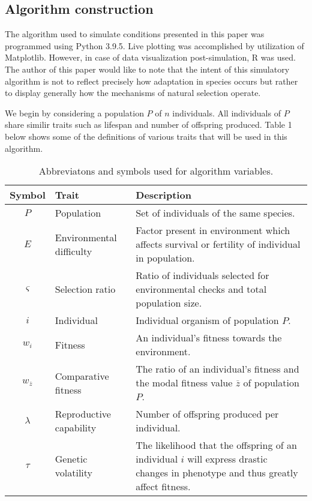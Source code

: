 \documentclass{article}
\begin{document}
    \subsection*{Algorithm construction}
    The algorithm used to simulate conditions presented in this paper was programmed using Python 3.9.5. Live plotting was accomplished by utilization of Matplotlib. However, in case of data visualization post-simulation, R was used. The author of this paper would like to note that the intent of this simulatory algorithm is not to reflect precisely how adaptation in species occurs but rather to display generally how the mechanisms of natural selection operate. 
    \par We begin by considering a population $P$ of $n$ individuals. All individuals of $P$ share similir traits such as lifespan and number of offspring produced. Table 1 below shows some of the definitions of various traits that will be used in this algorithm. 
    \begin{table}[h]
        \small
        \centering
        \renewcommand{\arraystretch}{1.2}
        \begin{tabular}{| c | l | p{} |}
            \hline
            \textbf{Symbol} & \textbf{Trait} & \textbf{Description} \\
            \hline
            $P$ & Population & Set of individuals of the same species. \\
            $E$ & Environmental difficulty & Factor present in environment which affects survival or fertility of individual in population. \\
            $\varsigma$ & Selection ratio & Ratio of individuals selected for environmental checks and total population size. \\
            \hline
            $i$ & Individual & Individual organism of population $P$. \\
            $w_i$ & Fitness & An individual's fitness towards the environment. \\
            $w_{\overline{z}}$ & Comparative fitness & The ratio of an individual's fitness and the modal fitness value $\overline{z}$ of population $P$. \\
            $\lambda$ & Reproductive capability & Number of offspring produced per individual. \\
            $\tau$ & Genetic volatility & The likelihood that the offspring of an individual $i$ will express drastic changes in phenotype and thus greatly affect fitness.
        \end{tabular}
        \caption{Abbreviatons and symbols used for algorithm variables.}
    \end{table} 
\end{document}
